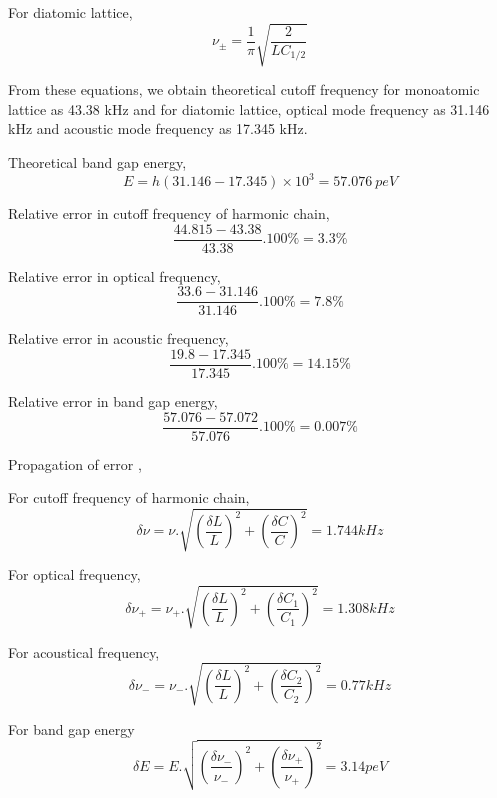 \documentclass[a4paper, amsfonts, amssymb, amsmath, reprint, showkeys, nofootinbib, twoside]{revtex4-1}
\begin{document}
For diatomic lattice,
\begin{equation}
	\nu_{\pm}=\frac{1}{\pi}\sqrt{\frac{2}{LC_{1/2}}}
\end{equation}

From these equations, we obtain theoretical cutoff frequency for monoatomic lattice as 43.38 kHz and for diatomic lattice, optical mode frequency as 31.146 kHz and acoustic mode frequency as 17.345 kHz.

Theoretical band gap energy,
\begin{equation}
	E=h(31.146-17.345)\times10^3=57.076~ peV
\end{equation}

Relative error in cutoff frequency of harmonic chain,
\begin{equation}
	\frac{44.815-43.38}{43.38}.100\%=3.3\%
\end{equation}

Relative error in optical frequency,
\begin{equation}
	\frac{33.6-31.146}{31.146}.100\%=7.8\%
\end{equation}

Relative error in acoustic frequency,
\begin{equation}
	\frac{19.8-17.345}{17.345}.100\%=14.15\%
\end{equation}

Relative error in band gap energy,
\begin{equation}
	\frac{57.076-57.072}{57.076}.100\%=0.007\%
\end{equation}

Propagation of error ,

For cutoff frequency of harmonic chain,
\begin{equation}
	\delta \nu=\nu.\sqrt{\left( \frac{\delta L}{L}\right) ^2+\left( \frac{\delta C}{C}\right) ^2}=1.744 kHz
\end{equation}

For optical frequency,
\begin{equation}
	\delta \nu_+=\nu_+.\sqrt{\left( \frac{\delta L}{L}\right) ^2+\left( \frac{\delta C_1}{C_1}\right) ^2}=1.308 kHz
\end{equation}

For acoustical frequency,
\begin{equation}
	\delta \nu_-=\nu_-.\sqrt{\left( \frac{\delta L}{L}\right) ^2+\left( \frac{\delta C_2}{C_2}\right) ^2}=0.77 kHz
\end{equation}

For band gap energy
\begin{equation}
	\delta E=E.\sqrt{\left( \frac{\delta \nu_-}{\nu_-}\right) ^2+\left( \frac{\delta \nu_+}{\nu_+}\right) ^2}=3.14 peV
\end{equation}
\end{document}
